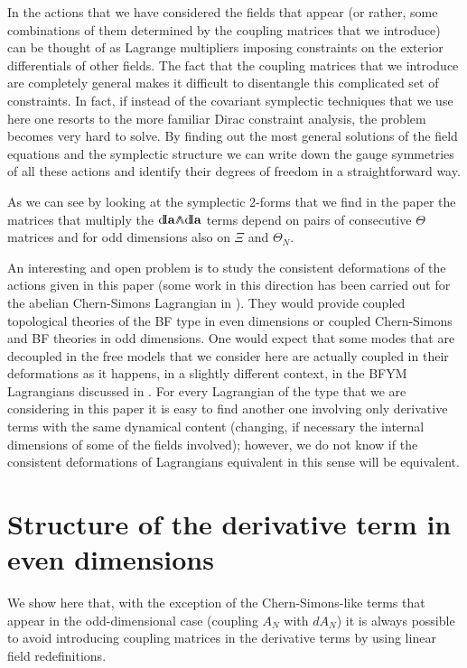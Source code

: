 \documentclass[prd,a4paper,twocolumn,amssymb,amsmath,nofootinbib,showpacs]{revtex4}
\newcommand{\dd}{\textrm{d\!I}}
\begin{document}
In the actions that we have considered the fields that appear (or
rather, some combinations of them determined by the coupling
matrices that we introduce) can be thought of as Lagrange
multipliers imposing constraints on the exterior differentials of
other fields. The fact that the coupling matrices that we
introduce are completely general makes it difficult to disentangle
this complicated set of constraints. In fact, if instead of the
covariant symplectic techniques that we use here one resorts to
the more familiar Dirac constraint analysis, the problem becomes
very hard to solve. By finding out the most general solutions of
the field equations and the symplectic structure we can write down
the gauge symmetries of all these actions and identify their
degrees of freedom in a straightforward way.

As we can see by looking at the symplectic 2-forms that we find in
the paper the matrices that multiply the $\dd \mathbf{a} {\wedge
\kern-.55em \wedge}\dd \mathbf{a}$ terms depend on pairs of
consecutive $\Theta$ matrices and for odd dimensions also on $\Xi$
and $\Theta_N$.

An interesting and open problem is to study the consistent
deformations of the actions given in this paper (some work in this
direction has been carried out for the abelian Chern-Simons
Lagrangian in \cite{Barnich:1993vg}). They would provide coupled
topological theories of the BF type in even dimensions or coupled
Chern-Simons and BF theories in odd dimensions. One would expect
that some modes that are decoupled in the free models that we
consider here are actually coupled in their deformations as it
happens, in a slightly different context, in the BFYM Lagrangians
discussed in \cite{Cattaneo:1997fg}. For every Lagrangian of the
type that we are considering in this paper it is easy to find
another one involving only derivative terms with the same
dynamical content (changing, if necessary the internal dimensions
of some of the fields involved); however, we do not know if the
consistent deformations of Lagrangians equivalent in this sense
will be equivalent.

\appendix

\section{\label{redef}Structure of the derivative term in even dimensions}

We show here that, with the exception of the Chern-Simons-like
terms that appear in the odd-dimensional case (coupling $A_N$ with
$dA_N$) it is always possible to avoid introducing coupling
matrices in the derivative terms by using linear field
redefinitions.
\end{document}
